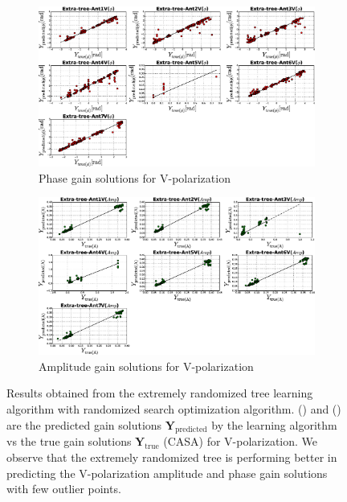 \begin{figure}[H]
   \centering
    \begin{subfigure}[t]{0.52\textheight}
        
        \includegraphics[width=\textwidth]{images/Extra-treeVphase.eps} 
        \caption{Phase gain solutions for V-polarization} \label{A7}
    \end{subfigure}
    
      \begin{subfigure}[t]{0.52\textheight}
       
        \includegraphics[width=\textwidth]{images/Extra-treeVamp.eps} 
        \caption{Amplitude gain solutions for V-polarization} \label{B7}
    \end{subfigure}
    \caption{Results obtained from the extremely randomized tree learning algorithm with randomized search optimization algorithm. () and () are the predicted gain solutions $\textbf{Y}_\mathrm{predicted}$ by the learning algorithm vs the true gain solutions $\textbf{Y}_\mathrm{true}$ (CASA) for V-polarization. We observe that the extremely randomized tree is performing better in predicting the V-polarization amplitude and phase gain solutions with few outlier points. }
    \label{BBB7}
    \end{figure} 
   
